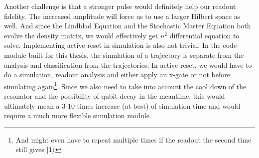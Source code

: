 Another challenge is that a stronger pulse would definitely help our readout fidelity. The increased amplitude will force us to use a larger Hilbert space as well. And since the Lindblad Equation and the Stochastic Master Equation both evolve the density matrix, we would effectively get $n^2$ differential equation to solve. Implementing active reset in simulation is also not trivial. In the code-module built for this thesis, the simulation of a trajectory is separate from the analysis and classification from the trajectories. In active reset, we would have to do a simulation, readout analysis and either apply an x-gate or not before simulating again\footnote{And might even have to repeat multiple times if the readout the second time still gives $\ket{1}$}. Since we also need to take into account the cool down of the resonator and the possibility of qubit decay in the meantime, this would ultimately mean a 3-10 times increase  (at best)  of simulation time and would require a much more flexible simulation module.